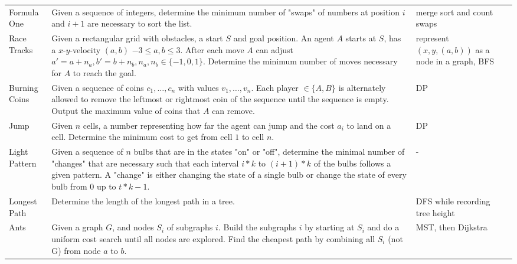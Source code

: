 \documentclass[a4paper, 10pt]{article}
\begin{document}
\begin{longtable}{ L{2cm} L{8cm} L{4cm} r}
        Formula One 
        & Given a sequence of integers, determine the minimum number of "swaps" of numbers at position $i$ and $i+1$ are necessary to sort the list. 
        & merge sort and count swaps &  \pageref{sec:formula_one} \\

        Race Tracks 
        & Given a rectangular grid with obstacles, a start $S$ and goal position. An agent $A$ starts at $S$, has a $x$-$y$-velocity $(a,b)$ 
            $-3\leq a,b \leq3$. After each move $A$ can adjust $a'=a+n_a, b'=b+n_b, n_a,n_b \in \{-1,0,1\}$. 
            Determine the minimum number of moves necessary for $A$ to reach the goal. 
        & represent $(x,y,(a,b))$ as a node in a graph, BFS &  \pageref{sec:race_tracks} \\

        Burning Coins 
        & Given a sequence of coins $c_1, \dots, c_n$ with values $v_1,\dots,v_n$. 
            Each player $\in \{A,B\}$ is alternately allowed to remove the leftmost or rightmost coin of the sequence until the sequence is empty. 
            Output the maximum value of coins that $A$ can remove. 
        & DP &  \pageref{sec:burning_coins} \\

        Jump 
        & Given $n$ cells, a number representing how far the agent can jump and the cost $a_i$ to land on a cell. 
            Determine the minimum cost to get from cell $1$ to cell $n$.        
        & DP &  \pageref{sec:jump} \\

        Light Pattern 
        & Given a sequence of $n$ bulbs that are in the states "on" or "off", determine the minimal number of "changes" that are necessary such that  
            each interval $i*k$ to $(i+1)*k$ of the bulbs follows a given pattern. A "change" is either changing the state of a single bulb or
            change the state of every  bulb from $0$ up to $t*k-1$.
        & - &  \pageref{sec:light_pattern} \\

        Longest Path 
        & Determine the length of the longest path in a tree.
        & DFS while recording tree height &  \pageref{sec:longest_path} \\

        Ants 
        & Given a graph $G$, and nodes $S_i$ of subgraphs $i$. 
            Build the subgraphs $i$ by starting at $S_i$ and do a uniform cost search until all nodes are explored.
            Find the cheapest path by combining all $S_i$ (not G) from node $a$ to $b$. 
        & MST, then Dijkstra &  \pageref{sec:ants} \\


\end{longtable}
\end{document}
